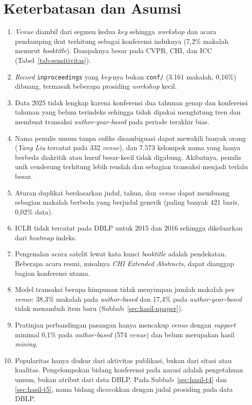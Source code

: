 \section{Keterbatasan dan Asumsi}
\begin{enumerate}
\item \textit{Venue} diambil dari segmen kedua \textit{key} sehingga \textit{workshop} dan acara pendamping ikut terhitung sebagai konferensi induknya (7,2\% makalah menurut \textit{booktitle}). Dampaknya besar pada CVPR, CHI, dan ICC (Tabel~\ref{tab:sensitivitas}).
\item \textit{Record} \texttt{inproceedings} yang \textit{key}-nya bukan \texttt{conf/} (3.161 makalah, 0,16\%) dibuang, termasuk beberapa prosiding \textit{workshop} kecil.
\item Data 2025 tidak lengkap karena konferensi dua tahunan genap dan konferensi tahunan yang belum terindeks sehingga tidak dipakai menghitung tren dan membuat transaksi \textit{author-year-based} pada periode terakhir bias.
\item Nama penulis umum tanpa sufiks disambiguasi dapat mewakili banyak orang (\textit{Yang Liu} tercatat pada 332 \textit{venue}), dan 7.573 kelompok nama yang hanya berbeda diakritik atau huruf besar-kecil tidak digabung. Akibatnya, penulis unik cenderung terhitung lebih rendah dan sebagian transaksi menjadi terlalu besar.
\item Aturan duplikat berdasarkan judul, tahun, dan \textit{venue} dapat membuang sebagian makalah berbeda yang berjudul generik (paling banyak 421 baris, 0,02\% data).
\item ICLR tidak tercatat pada DBLP untuk 2015 dan 2016 sehingga dikeluarkan dari \textit{heatmap} indeks.
\item Pengenalan acara satelit lewat kata kunci \textit{booktitle} adalah pendekatan. Beberapa acara resmi, misalnya \textit{CHI Extended Abstracts}, dapat dianggap bagian konferensi utama.
\item Model transaksi berupa himpunan tidak menyimpan jumlah makalah per \textit{venue}: 38,3\% makalah pada \textit{author-based} dan 17,4\% pada \textit{author-year-based} tidak menambah item baru (Subbab~\ref{sec:hasil-npaper}).
\item Pratinjau perbandingan pasangan hanya mencakup \textit{venue} dengan \textit{support} minimal 0,1\% pada \textit{author-based} (574 \textit{venue}) dan belum merupakan hasil \textit{mining}.
\item Popularitas hanya diukur dari aktivitas publikasi, bukan dari sitasi atau kualitas. Pengelompokan bidang konferensi pada narasi adalah pengetahuan umum, bukan atribut dari data DBLP. Pada Subbab~\ref{sec:hasil-t4} dan \ref{sec:hasil-t5}, nama bidang dicocokkan dengan judul prosiding pada data DBLP.

\end{enumerate}
